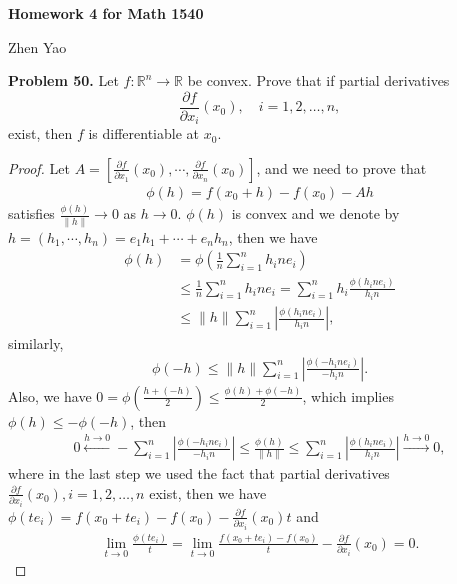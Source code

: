 \documentclass[12pt,leqno]{amsart}
\theoremstyle{definition}
\begin{document}
\centerline{\bf Homework 4 for Math 1540}
\centerline{Zhen Yao}

\bigskip


\noindent
{\bf Problem 50.}
Let $f:\mathbb{R}^n\to\mathbb{R}$ be convex. Prove that if partial derivatives
$$
\frac{\partial f}{\partial x_i}(x_0),
\quad
i=1,2,\ldots,n,
$$
exist, then $f$ is differentiable at $x_0$.
\begin{proof}
Let $A = \left[\frac{\partial f}{\partial x_1}(x_0), \cdots, \frac{\partial f}{\partial x_n}(x_0)\right]$, and we need to prove that 
\begin{align*}
    \phi(h) = f(x_0+h) - f(x_0) - Ah
\end{align*}
satisfies $\frac{\phi(h)}{\|h\|} \to 0$ as $h \to 0$. $\phi(h)$ is convex and we denote by $h = \left(h_1, \cdots, h_n \right) = e_1 h_1 + \cdots + e_n h_n$, then we have 
\begin{align*}
    \phi(h) & = \phi \left(\frac{1}{n} \sum^n_{i=1} h_i n e_i \right) \\
    & \leq \frac{1}{n}\sum^n_{i=1} h_i n e_i = \sum^n_{i=1} h_i \frac{\phi(h_i n e_i)}{h_i n} \\
    & \leq \|h\| \sum^n_{i=1} \left|\frac{\phi(h_i n e_i)}{h_i n}\right|,
\end{align*}
similarly, 
\begin{align*}
    \phi(-h) \leq \|h\| \sum^n_{i=1} \left|\frac{\phi( - h_i n e_i)}{ - h_i n}\right|.
\end{align*}
Also, we have $0 = \phi \left(\frac{h + (-h)}{2}\right) \leq \frac{\phi(h) + \phi(-h)}{2}$, which implies $\phi(h) \leq - \phi(-h)$, then 
\begin{align*}
    0 \xleftarrow{h \to 0} - \sum^n_{i=1} \left|\frac{\phi( - h_i n e_i)}{ - h_i n}\right| \leq \frac{\phi(h)}{\|h\|} \leq \sum^n_{i=1} \left|\frac{\phi( h_i n e_i)}{ h_i n}\right| \xrightarrow{h \to 0} 0,
\end{align*}
where in the last step we used the fact that partial derivatives $\frac{\partial f}{\partial x_i}(x_0), i=1,2,\ldots,n$ exist, then we have $\phi(t e_i) = f(x_0+t e_i) - f(x_0) - \frac{\partial f}{\partial x_i}(x_0)t$ and 
\begin{align*}
    \lim_{t\to 0}\frac{\phi(t e_i)}{t} = \lim_{t\to 0} \frac{f(x_0+t e_i) - f(x_0)}{t} - \frac{\partial f}{\partial x_i}(x_0) = 0.
\end{align*}
\end{proof}

\medskip
\end{document}
